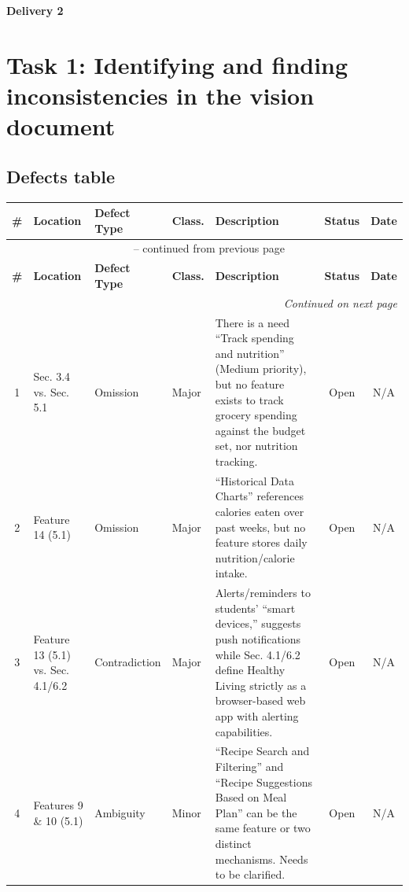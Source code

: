 \documentclass[11pt]{article}
\begin{document}
\begin{center}
    {\LARGE \textbf{Delivery 2}}\\[0.5em]
\end{center}
\section{Task 1: Identifying and finding inconsistencies in the vision document}

\subsection{Defects table}

\small
\renewcommand{\arraystretch}{1.3}
\begin{longtable}{|c|p{2.3cm}|p{2cm}|p{1.5cm}|p{4.5cm}|c|c|}
\hline
\textbf{\#} & \textbf{Location} & \textbf{Defect Type} & \textbf{Class.} & \textbf{Description} & \textbf{Status} & \textbf{Date} \\
\hline
\endfirsthead

\multicolumn{7}{c}{\tablename\ \thetable{} -- continued from previous page} \\
\hline
\textbf{\#} & \textbf{Location} & \textbf{Defect Type} & \textbf{Class.} & \textbf{Description} & \textbf{Status} & \textbf{Date} \\
\hline
\endhead

\hline
\multicolumn{7}{r}{\textit{Continued on next page}} \\
\endfoot

\hline
\endlastfoot

1 & Sec. 3.4 vs. Sec. 5.1 & Omission & Major & There is a need ``Track spending and nutrition'' (Medium priority), but no feature exists to track grocery spending against the budget set, nor nutrition tracking. & Open & N/A \\
\hline

2 & Feature 14 (5.1) & Omission & Major & ``Historical Data Charts'' references calories eaten over past weeks, but no feature stores daily nutrition/calorie intake. & Open & N/A \\
\hline

3 & Feature 13 (5.1) vs. Sec. 4.1/6.2 & Contradiction & Major & Alerts/reminders to students' ``smart devices,'' suggests push notifications while Sec. 4.1/6.2 define Healthy Living strictly as a browser-based web app with alerting capabilities. & Open & N/A \\
\hline

4 & Features 9 \& 10 (5.1) & Ambiguity & Minor & ``Recipe Search and Filtering'' and ``Recipe Suggestions Based on Meal Plan'' can be  the same feature or two distinct mechanisms. Needs to be clarified. & Open & N/A \\
\hline


\end{longtable}
\end{document}
